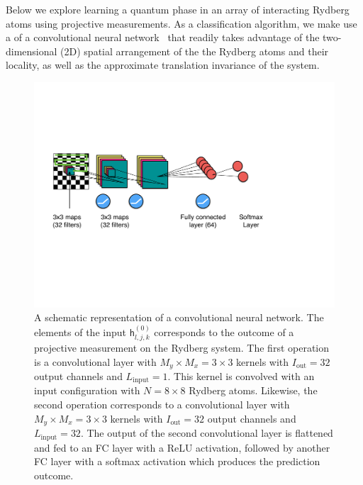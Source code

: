 \documentclass[twocolumn,english,reprint,superscriptaddress,longbibliography,pra]{revtex4-1}
\begin{document}
Below we explore learning a quantum phase in an array of interacting Rydberg atoms using projective measurements. As a classification algorithm, we make use a of a convolutional neural network~\cite{Goodfellow-et-al-2016} that readily takes advantage of the two-dimensional (2D) spatial arrangement of the the Rydberg atoms and their locality, as well as the approximate translation invariance of the system. 

\begin{figure}[t]
\noindent \centering{}\includegraphics[width=\columnwidth]{CNN.pdf}
\caption{A schematic representation of a convolutional neural network. The elements of the input $\mathsf{h}^{(0)}_{l,j,k}$ corresponds to the outcome of a projective measurement on the Rydberg system. The first operation is a convolutional layer with $ M_y \times M_x = 3  \times 3$ kernels  with $I_{\text{out}} = 32$ output channels and $L_{\text{input}}=1$. This kernel is convolved with an input configuration with $N = 8 \times 8$ Rydberg atoms. Likewise, the second operation corresponds to a convolutional layer with $ M_y \times M_x = 3  \times 3$ kernels  with $I_{\text{out}} = 32$ output channels and $L_{\text{input}}=32$. The output of the second convolutional layer is flattened and fed to an FC layer with a ReLU activation, followed by another FC layer with a softmax activation which produces the prediction outcome. }
\label{Fig::CNN} 
\end{figure}
\end{document}
